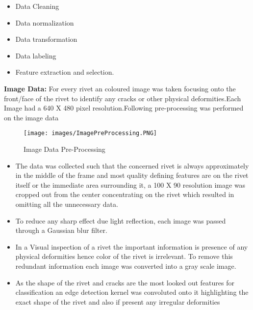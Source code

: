 \documentclass{article}
\begin{document}
\begin{itemize}
 
    \item Data Cleaning
    \item Data normalization
    \item Data transformation
    \item Data labeling
    \item Feature extraction and selection.
    \end{itemize}

\textbf{Image Data: }
For every rivet an coloured image was taken focusing onto the front/face of the rivet to identify any cracks or other physical deformities.Each Image had a 640 X 480 pixel resolution.Following pre-processing was performed on the image data\\

\begin{figure}[H]
    \centering
    \texttt{[image: images/ImagePreProcessing.PNG]}
    \caption{Image Data Pre-Processing}
    \label{fig: ImageDataPreprocessing}
\end{figure}

 \begin{itemize}
     \item The data was collected such that the concerned rivet is always approximately in the middle of the frame and most quality defining features are on the rivet itself or the immediate area surrounding it, a 100 X 90 resolution image was cropped out from the center concentrating on the rivet which resulted in omitting all the unnecessary data.
     \item To reduce any sharp effect due light reflection, each image was passed through a Gaussian blur filter.
     
     \item In a Visual inspection of a rivet the important information is presence of any physical deformities hence color of the rivet is irrelevant. To remove this redundant information each image was converted into a gray scale image.  
     
     \item As the shape of the rivet and cracks are the most looked out features for classification an edge detection kernel was convoluted onto it highlighting the exact shape of the rivet and also if present any irregular deformities  
     
    \end{itemize}
\end{document}
